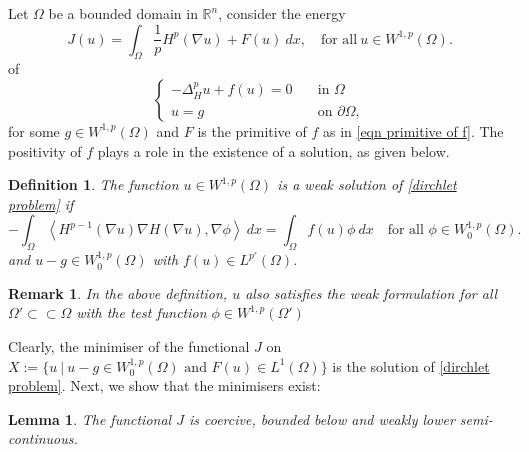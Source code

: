 \documentclass[11pt]{amsart}
\newtheorem{lemma}[theorem]{Lemma}
\newtheorem{definition}[theorem]{Definition}
\newtheorem{remark}{Remark}
\newcommand{\rn}{\mathbb{R}^{n}}
\newcommand{\D}{\nabla}
\newcommand{\Fin}[1]{H^{p-1}(\nabla #1)\nabla H(\nabla #1)}
\numberwithin{equation}{section}
\begin{document}
Let $\Omega$ be a bounded domain in $\rn$, consider the energy 
 \begin{equation*}
    J(u)=\int_{\Omega}\frac{1}{p}H^{p}\left(\D u\right)+F(u) \ dx, \quad \text{for all}\ u\in W^{1,p}(\Omega).
\end{equation*}
of 
\begin{equation}\label{dirchlet problem}
     \begin{cases}
        -\Delta_{H}^{p}u+f(u)=0\quad &\text{in }\Omega\\
        u=g &\text{on } \partial\Omega,
    \end{cases}
\end{equation}
for some $g\in W^{1,p}(\Omega)$ and $F$ is the primitive of $f$ as in \eqref{eqn primitive of f}. The positivity of $f$ plays a role in the existence of a solution, as given below. 
\begin{definition}\label{dfn weak solution to dirchlet prob}
    The function $u\in W^{1,p}(\Omega)$ is a weak solution of \eqref{dirchlet problem} if
    \begin{equation*}
        -\int_{\Omega}\left<\Fin{u}, \D \phi\right>\ dx=\int_{\Omega}f(u)\phi\ dx \quad \text{for all }\phi\in W_{0}^{1,p}(\Omega). 
    \end{equation*}
    and $u-g\in W_{0}^{1,p}(\Omega)$ with $f(u)\in L^{p'}(\Omega)$.
\end{definition}
\begin{remark}
    In the above definition, $u$ also satisfies the weak formulation for all $\Omega'\subset\subset\Omega$ with the test function $\phi\in W^{1,p}(\Omega')$
\end{remark}
Clearly, the minimiser of the functional $J$ on $X:=\{u~|~u-g\in W_{0}^{1,p}(\Omega) \text{ and }F(u)\in L^{1}(\Omega)\}$ is the solution of \eqref{dirchlet problem}. Next, we show that the minimisers exist:
\begin{lemma}
    The functional $J$ is coercive, bounded below and weakly lower semi-continuous.
\end{lemma}
\end{document}

